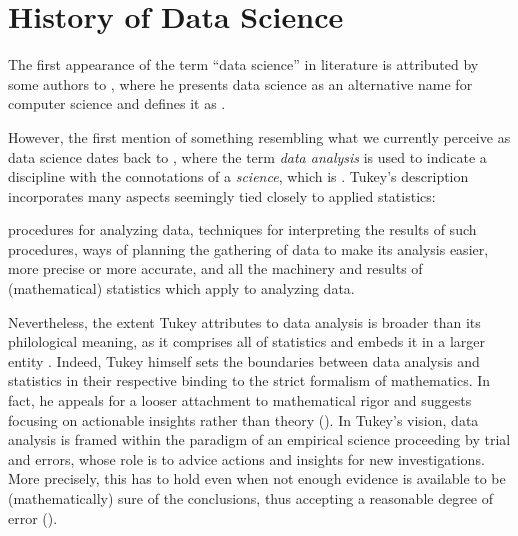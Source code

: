 \section{History of Data Science}
\label{sec:historyDS}

The first appearance of the term ``data science” in literature is attributed by some authors 
to , where he presents data science as an alternative name for computer science and defines it as .


However, the first mention of something resembling what we currently perceive as data science dates back to , where the term \emph{data analysis} is used to indicate a discipline with the connotations of a \emph{science}, which is . 
Tukey's description incorporates many aspects seemingly tied closely to applied statistics: 
\begin{displayquote}
procedures for analyzing data, techniques for interpreting the results of such procedures, ways of planning the gathering of data to make its analysis easier, more precise or more accurate, and all the machinery and results of (mathematical) statistics which apply to analyzing data.
\end{displayquote}
Nevertheless, the extent Tukey attributes to data analysis is broader than its philological meaning, as it comprises all of statistics and embeds it in a larger entity \cite{huber2012data, donoho201750years}.
Indeed, Tukey himself sets the boundaries between data analysis and statistics in their respective binding to the strict formalism of mathematics.
In fact, he appeals for a looser attachment to mathematical rigor and suggests focusing on actionable insights rather than theory ().
In Tukey's vision, data analysis is framed within the paradigm of an empirical science proceeding by trial and errors, whose role is to advice actions and insights for new investigations.
More precisely, this has to hold even when not enough evidence is available to be (mathematically) sure of the conclusions, thus accepting a reasonable degree of error ().
